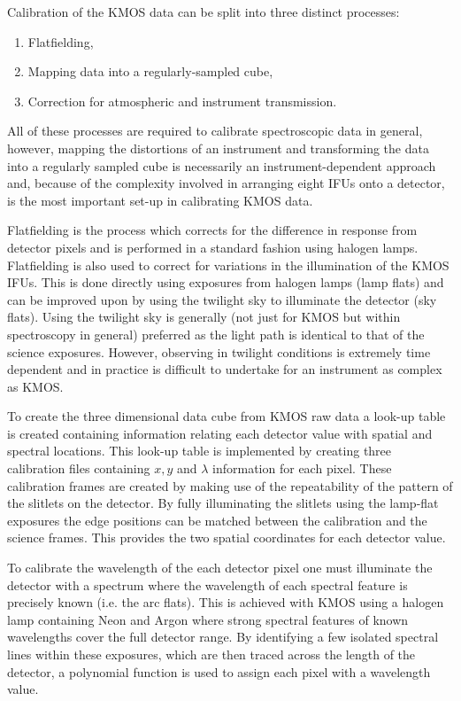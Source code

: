 Calibration of the KMOS data can be split into three distinct processes:

\begin{enumerate}
    \item Flatfielding,
    \item Mapping data into a regularly-sampled cube,
    \item Correction for atmospheric and instrument transmission.
\end{enumerate}

All of these processes are required to calibrate spectroscopic data in general, however, mapping the distortions of an instrument and transforming the data into a regularly sampled cube is necessarily an instrument-dependent approach and,
because of the complexity involved in arranging eight IFUs onto a detector, is the most important set-up in calibrating KMOS data.

Flatfielding is the process which corrects for the difference in response from detector pixels and is performed in a standard fashion using halogen lamps.
Flatfielding is also used to correct for variations in the illumination of the KMOS IFUs.
This is done directly using exposures from halogen lamps (lamp flats) and can be improved upon by using the twilight sky to illuminate the detector (sky flats).
Using the twilight sky is generally (not just for KMOS but within spectroscopy in general) preferred as the light path is identical to that of the science exposures.
However, observing in twilight conditions is extremely time dependent and in practice is difficult to undertake for an instrument as complex as KMOS.

To create the three dimensional data cube from KMOS raw data a look-up table is created containing information relating each detector value with spatial and spectral locations.
This look-up table is implemented by creating three calibration files containing $x, y$ and $\lambda$ information for each pixel.
These calibration frames are created by making use of the repeatability of the pattern of the slitlets on the detector.
By fully illuminating the slitlets using the lamp-flat exposures the edge positions can be matched between the calibration and the science frames.
This provides the two spatial coordinates for each detector value.

To calibrate the wavelength of the each detector pixel one must illuminate the detector with a spectrum where the wavelength of each spectral feature is precisely known (i.e. the arc flats).
This is achieved with KMOS using a halogen lamp containing Neon and Argon where strong spectral features of known wavelengths cover the full detector range.
By identifying a few isolated spectral lines within these exposures, which are then traced across the length of the detector, a polynomial function is used to assign each pixel with a wavelength value.

